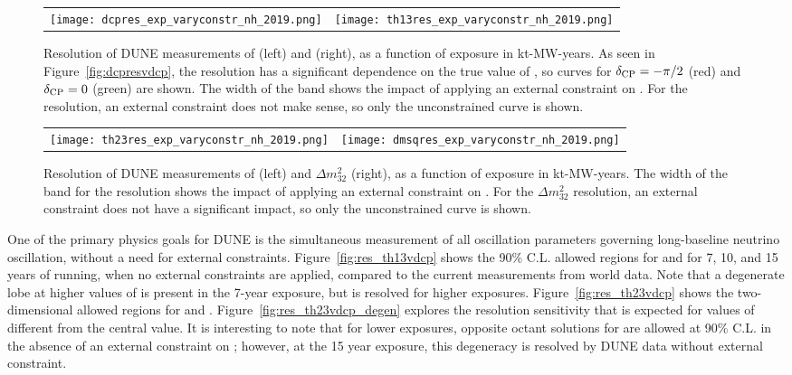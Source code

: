 \begin{figure}[h!]
    \centering
    \begin{tabular}{cc}
		\texttt{[image: dcpres\_exp\_varyconstr\_nh\_2019.png]} &
		\texttt{[image: th13res\_exp\_varyconstr\_nh\_2019.png]} 
	\end{tabular}  
	\caption[Resolution of DUNE measurements of \deltacp and , as a function of exposure]{Resolution of DUNE measurements of \deltacp (left) and  (right), as a function of exposure in kt-MW-years. As seen in Figure~\ref{fig:dcpresvdcp}, the \deltacp resolution has a significant dependence on the true value of \deltacp, so curves for $\delta_{\rm CP}=-\pi/2$ (red) and $\delta_{\rm CP}=0$ (green) are shown. The width of the band shows the impact of applying an external constraint on . For the  resolution, an external constraint does not make sense, so only the unconstrained curve is shown.}
    \label{fig:appres_exp}
\end{figure}

\begin{figure}[h!]
    \centering
    \begin{tabular}{cc}
		\texttt{[image: th23res\_exp\_varyconstr\_nh\_2019.png]} &
		\texttt{[image: dmsqres\_exp\_varyconstr\_nh\_2019.png]} 
	\end{tabular}  
	\caption[Resolution of DUNE measurements of \deltacp and , as a function of exposure]{Resolution of DUNE measurements of  (left) and $\Delta m^{2}_{32}$ (right), as a function of exposure in kt-MW-years. The width of the band for the  resolution shows the impact of applying an external constraint on . For the $\Delta m^{2}_{32}$ resolution, an external constraint does not have a significant impact, so only the unconstrained curve is shown.}
    \label{fig:disres_exp}
\end{figure}

One of the primary physics goals for DUNE is the simultaneous measurement of all oscillation parameters governing long-baseline neutrino oscillation, without a need for external constraints. Figure~\ref{fig:res_th13vdcp} shows the 90\% C.L. allowed regions for  and \deltacp for 7, 10, and 15 years of running, when no external constraints are applied, compared to the current measurements from world data. Note that a degenerate lobe at higher values of  is present in the 7-year exposure, but is resolved for higher exposures. Figure~\ref{fig:res_th23vdcp} shows the two-dimensional allowed regions for  and \deltacp. Figure~\ref{fig:res_th23vdcp_degen} explores the resolution sensitivity that is expected for values of  different from the  central value. It is interesting to note that for lower exposures, opposite octant solutions for  are allowed at 90\% C.L. in the absence of an external constraint on ; however, at the 15 year exposure, this degeneracy is resolved by DUNE data without external constraint.

